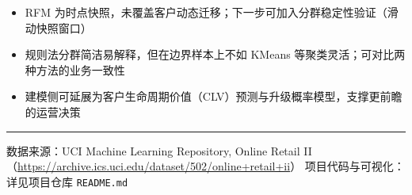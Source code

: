\documentclass[10pt,a4paper,fontset=windows]{ctexart}
\begin{document}
\begin{itemize}
    \item RFM 为时点快照，未覆盖客户动态迁移；下一步可加入分群稳定性验证（滑动快照窗口）
    \item 规则法分群简洁易解释，但在边界样本上不如 KMeans 等聚类灵活；可对比两种方法的业务一致性
    \item 建模侧可延展为客户生命周期价值（CLV）预测与升级概率模型，支撑更前瞻的运营决策
\end{itemize}

\vspace{6pt}
\hrule
\vspace{3pt}
\footnotesize\color{subcolor}
数据来源：UCI Machine Learning Repository, Online Retail II（\url{https://archive.ics.uci.edu/dataset/502/online+retail+ii}）\quad
项目代码与可视化：详见项目仓库 \texttt{README.md}
\end{document}
